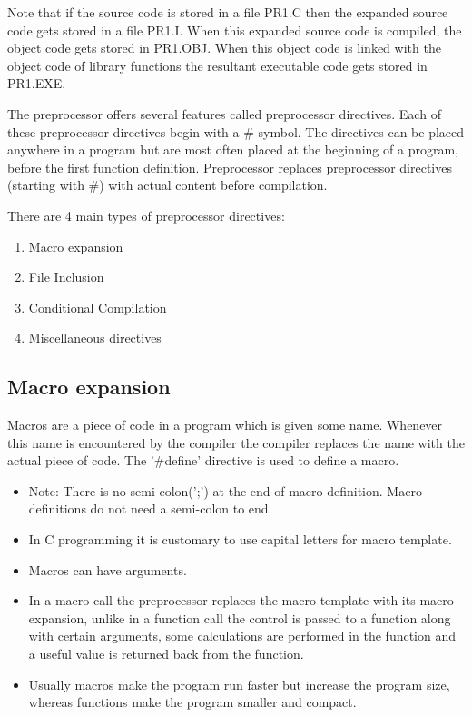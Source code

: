 Note that if the source code is stored in a file PR1.C then the expanded source code gets stored in a file PR1.I. When this expanded source code is compiled, the object code gets stored in PR1.OBJ. When this object code is linked with the object code of library functions the resultant executable code gets stored in PR1.EXE.

\par The preprocessor offers several features called preprocessor directives. Each of these preprocessor directives begin with a \# symbol. The directives can be placed anywhere in a program but are most often placed at the beginning of a program, before the first function definition. Preprocessor replaces preprocessor directives (starting with \#) with actual content before compilation. 

There are 4 main types of preprocessor directives: 
\begin{enumerate}
    \item Macro expansion
    \item File Inclusion
    \item Conditional Compilation
    \item Miscellaneous directives
\end{enumerate} 

\subsection{Macro expansion}

Macros are a piece of code in a program which is given some name. Whenever this name is encountered by the compiler the compiler replaces the name with the actual piece of code. The '\#define' directive is used to define a macro. 

\begin{itemize}
    \item Note: There is no semi-colon(';') at the end of macro definition. Macro definitions do not need a semi-colon to end.
    \item In C programming it is customary to use capital letters for macro template.
    \item Macros can have arguments.
    \item In a macro call the preprocessor replaces the macro template with its macro expansion, unlike in a function call the control is passed to a function along with certain arguments, some calculations are performed in the function and a useful value is returned back from the function.
    \item Usually macros make the program run faster but increase the program size, whereas functions make the program smaller and compact.
\end{itemize}


